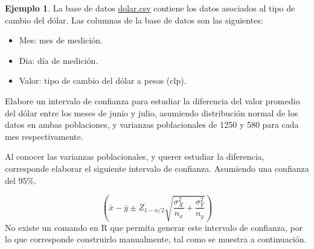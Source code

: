 \documentclass[
  11pt,
]{book}
\newenvironment{Shaded}{\begin{snugshade}}{\end{snugshade}}
\newcommand{\CommentTok}[1]{\textcolor[rgb]{0.56,0.35,0.01}{\textit{#1}}}
\newcommand{\DecValTok}[1]{\textcolor[rgb]{0.00,0.00,0.81}{#1}}
\newcommand{\FloatTok}[1]{\textcolor[rgb]{0.00,0.00,0.81}{#1}}
\newcommand{\FunctionTok}[1]{\textcolor[rgb]{0.13,0.29,0.53}{\textbf{#1}}}
\newcommand{\NormalTok}[1]{#1}
\newcommand{\OtherTok}[1]{\textcolor[rgb]{0.56,0.35,0.01}{#1}}
\newcommand{\SpecialCharTok}[1]{\textcolor[rgb]{0.81,0.36,0.00}{\textbf{#1}}}
\newcommand{\StringTok}[1]{\textcolor[rgb]{0.31,0.60,0.02}{#1}}
\providecommand{\tightlist}{%
  \setlength{\itemsep}{0pt}\setlength{\parskip}{0pt}}
\theoremstyle{definition}
\theoremstyle{definition}
\newtheorem{example}{Ejemplo}[chapter]
\theoremstyle{definition}
\theoremstyle{definition}
\theoremstyle{remark}
\begin{document}
\begin{example}
\protect\hypertarget{exm:ICdiferencianormal}{}\label{exm:ICdiferencianormal}La base de datos \href{https://raw.githubusercontent.com/Dfranzani/Bases-de-datos-para-cursos/main/2022-2/Estad\%C3\%ADstica\%201/dolar.csv}{dolar.csv} contiene los datos asociados al tipo de cambio del dólar. Las columnas de la base de datos son las siguientes:

\begin{itemize}
\tightlist
\item
  Mes: mes de medición.
\item
  Dia: día de medición.
\item
  Valor: tipo de cambio del dólar a pesos (clp).
\end{itemize}

Elabore un intervalo de confianza para estudiar la diferencia del valor promedio del dólar entre los meses de junio y julio, asumiendo distribución normal de los datos en ambas poblaciones, y varianzas poblacionales de 1250 y 580 para cada mes respectivamente.

Al conocer las varianzas poblacionales, y querer estudiar la diferencia, corresponde elaborar el siguiente intervalo de confianza. Asumiendo una confianza del 95\%.

\[\left(\bar{x} - \bar{y} \pm Z_{1-\alpha/2}\displaystyle\sqrt{\displaystyle\frac{\sigma^2_X}{n_x} + \displaystyle\frac{\sigma^2_Y}{n_y}}\right)\]
No existe un comando en R que permita generar este intervalo de confianza, por lo que corresponde construirlo manualmente, tal como se muestra a continuación.

\begin{Shaded}
\end{Shaded}


\end{example}
\end{document}
